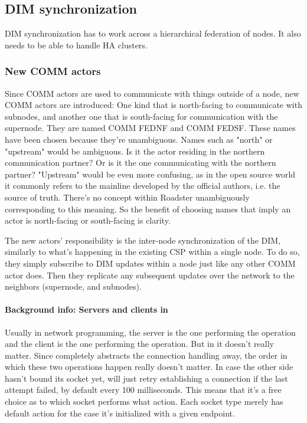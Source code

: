 \subsection{DIM synchronization}
DIM synchronization has to work across a hierarchical federation of nodes. It
also needs to be able to handle HA clusters.

\subsubsection{New COMM actors}
Since COMM actors are used to communicate with things outside of a node, new COMM
actors are introduced: One kind that is north-facing to communicate
with subnodes, and another one that is south-facing for communication with the
supernode. They are named COMM FEDNF and COMM FEDSF. These names have been
chosen because they're unambiguous. Names such as "north" or "upstream" would
be ambiguous. Is it the actor residing in the northern communication partner?
Or is it the one communicating with the northern partner? "Upstream" would be
even more confusing, as in the open source world it commonly refers to the
mainline developed by the official authors, i.e. the source of truth. There's
no concept within Roadster unambiguously corresponding to this meaning. So the
benefit of choosing names that imply an actor is north-facing or south-facing
is clarity.

The new actors' responsibility is the inter-node synchronization of the DIM,
similarly to what's happening in the existing \gls{CSP} within a single node.
To do so, they simply subscribe to DIM updates within a node just like any
other COMM actor does.  Then they replicate any subsequent updates over the network
to the neighbors (supernode, and subnodes).

\paragraph{Background info: Servers and clients in \zmq}
Usually in network programming, the server is the one performing the
 operation and the client is the one performing the 
operation. But in \zmq it doesn't really matter. Since \zmq completely
abstracts the connection handling away, the order in which these two operations
happen really doesn't matter. In case the other side hasn't bound its socket
yet, \zmq will just retry establishing a connection if the last attempt failed,
by default every 100 milliseconds. This means that it's a free choice as to which socket
performs what action. Each socket type merely has default action for the case
it's initialized with a given endpoint.


